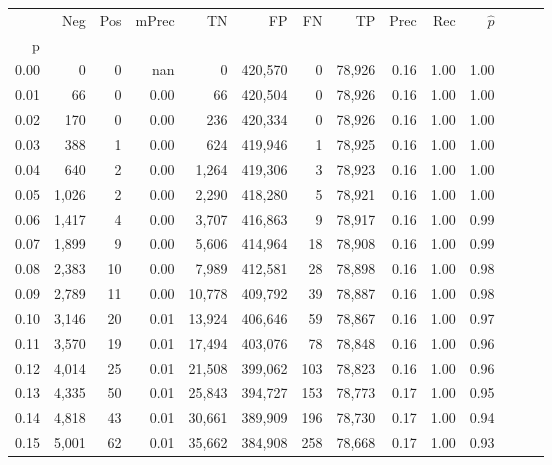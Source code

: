 \begin{tabular}{rrrrrrrrrrrrrr}
\toprule
{} &    Neg &    Pos & mPrec &       TN &       FP &      FN &      TP &  Prec &   Rec & $\hat{p}$ \\
p    &        &        &       &          &          &         &         &       &       &           \\
\midrule
0.00 &      0 &      0 &   nan &        0 &  420,570 &       0 &  78,926 &  0.16 &  1.00 &      1.00 \\
0.01 &     66 &      0 &  0.00 &       66 &  420,504 &       0 &  78,926 &  0.16 &  1.00 &      1.00 \\
0.02 &    170 &      0 &  0.00 &      236 &  420,334 &       0 &  78,926 &  0.16 &  1.00 &      1.00 \\
0.03 &    388 &      1 &  0.00 &      624 &  419,946 &       1 &  78,925 &  0.16 &  1.00 &      1.00 \\
0.04 &    640 &      2 &  0.00 &    1,264 &  419,306 &       3 &  78,923 &  0.16 &  1.00 &      1.00 \\
0.05 &  1,026 &      2 &  0.00 &    2,290 &  418,280 &       5 &  78,921 &  0.16 &  1.00 &      1.00 \\
0.06 &  1,417 &      4 &  0.00 &    3,707 &  416,863 &       9 &  78,917 &  0.16 &  1.00 &      0.99 \\
0.07 &  1,899 &      9 &  0.00 &    5,606 &  414,964 &      18 &  78,908 &  0.16 &  1.00 &      0.99 \\
0.08 &  2,383 &     10 &  0.00 &    7,989 &  412,581 &      28 &  78,898 &  0.16 &  1.00 &      0.98 \\
0.09 &  2,789 &     11 &  0.00 &   10,778 &  409,792 &      39 &  78,887 &  0.16 &  1.00 &      0.98 \\
0.10 &  3,146 &     20 &  0.01 &   13,924 &  406,646 &      59 &  78,867 &  0.16 &  1.00 &      0.97 \\
0.11 &  3,570 &     19 &  0.01 &   17,494 &  403,076 &      78 &  78,848 &  0.16 &  1.00 &      0.96 \\
0.12 &  4,014 &     25 &  0.01 &   21,508 &  399,062 &     103 &  78,823 &  0.16 &  1.00 &      0.96 \\
0.13 &  4,335 &     50 &  0.01 &   25,843 &  394,727 &     153 &  78,773 &  0.17 &  1.00 &      0.95 \\
0.14 &  4,818 &     43 &  0.01 &   30,661 &  389,909 &     196 &  78,730 &  0.17 &  1.00 &      0.94 \\
0.15 &  5,001 &     62 &  0.01 &   35,662 &  384,908 &     258 &  78,668 &  0.17 &  1.00 &      0.93 \\

\end{tabular}
